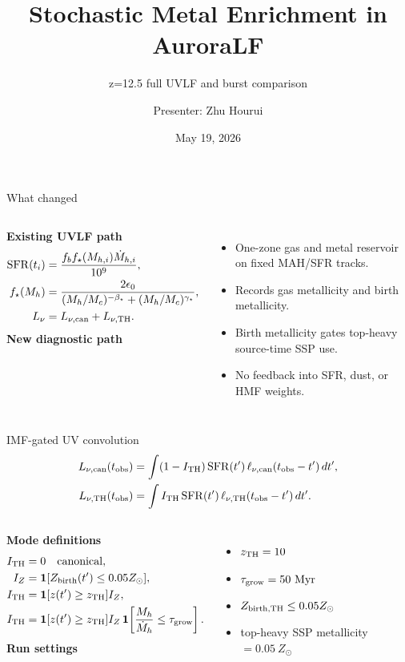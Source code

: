 \documentclass[aspectratio=169,10pt]{beamer}
\title{Stochastic Metal Enrichment in AuroraLF}
\subtitle{z=12.5 full UVLF and burst comparison}
\author{Presenter: Zhu Hourui}
\institute{AuroraLF}
\date{May 19, 2026}
\begin{document}
\begin{frame}
  \titlepage
\end{frame}

\begin{frame}{What changed}
\begin{columns}[T]
\textbf{Existing UVLF path}
\begin{align*}
{\rm SFR}(t_i) &=
  \frac{f_b f_\star(M_{h,i}) \dot M_{h,i}}{10^9},\\
f_\star(M_h) &=
  \frac{2\epsilon_0}{(M_h/M_c)^{-\beta_\star}
  +(M_h/M_c)^{\gamma_\star}},\\
L_\nu &= L_{\nu,{\rm can}}+L_{\nu,{\rm TH}} .
\end{align*}
\textbf{New diagnostic path}
\begin{itemize}
\item One-zone gas and metal reservoir on fixed MAH/SFR tracks.
\item Records gas metallicity and birth metallicity.
\item Birth metallicity gates top-heavy source-time SSP use.
\item No feedback into SFR, dust, or HMF weights.
\end{itemize}
\end{columns}
\end{frame}

\begin{frame}{IMF-gated UV convolution}
\begin{align*}
L_{\nu,{\rm can}}(t_{\rm obs}) &=
\int (1-I_{\rm TH})\,{\rm SFR}(t')\,
\ell_{\nu,{\rm can}}(t_{\rm obs}-t')\,dt',\\
L_{\nu,{\rm TH}}(t_{\rm obs}) &=
\int I_{\rm TH}\,{\rm SFR}(t')\,
\ell_{\nu,{\rm TH}}(t_{\rm obs}-t')\,dt'.
\end{align*}
\vspace{2mm}
\begin{columns}[T]
\textbf{Mode definitions}
\begin{align*}
I_{\rm TH}&=0 \quad {\rm canonical},\\
I_Z&=\mathbf{1}[Z_{\rm birth}(t')\le0.05Z_\odot],\\
I_{\rm TH}&=\mathbf{1}[z(t')\ge z_{\rm TH}]I_Z,\\
I_{\rm TH}&=\mathbf{1}[z(t')\ge z_{\rm TH}]I_Z
\,\mathbf{1}\!\left[\frac{M_h}{\dot M_h}\le \tau_{\rm grow}\right].
\end{align*}
\textbf{Run settings}
\begin{itemize}
\item $z_{\rm TH}=10$
\item $\tau_{\rm grow}=50~{\rm Myr}$
\item $Z_{\rm birth,TH}\le0.05Z_\odot$
\item top-heavy SSP metallicity $=0.05~Z_\odot$
\end{itemize}
\end{columns}
\end{frame}
\end{document}
